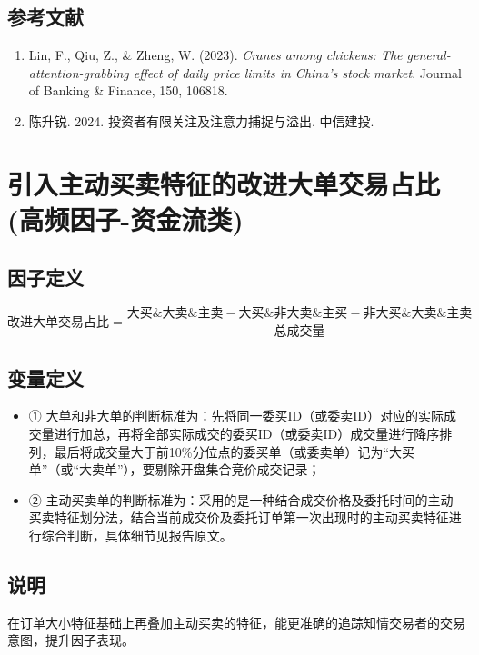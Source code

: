 \documentclass{article}
\begin{document}
\subsection{参考文献}
\begin{enumerate}
    \item Lin, F., Qiu, Z., \& Zheng, W. (2023). \textit{Cranes among chickens: The general-attention-grabbing effect of daily price limits in China's stock market}. Journal of Banking \& Finance, 150, 106818.
    \item 陈升锐. 2024. 投资者有限关注及注意力捕捉与溢出. 中信建投.
\end{enumerate}

\section{引入主动买卖特征的改进大单交易占比(高频因子-资金流类)}

\subsection{因子定义}

\begin{equation}
    \text{改进大单交易占比} = \frac{\text{大买\&大卖\&主卖} - \text{大买\&非大卖\&主买} - \text{非大买\&大卖\&主卖}}{\text{总成交量}}
\end{equation}

\subsection{变量定义}
\begin{itemize}
    \item ① 大单和非大单的判断标准为：先将同一委买ID（或委卖ID）对应的实际成交量进行加总，再将全部实际成交的委买ID（或委卖ID）成交量进行降序排列，最后将成交量大于前10\%分位点的委买单（或委卖单）记为“大买单”（或“大卖单”），要剔除开盘集合竞价成交记录；
    \item ② 主动买卖单的判断标准为：采用的是一种结合成交价格及委托时间的主动买卖特征划分法，结合当前成交价及委托订单第一次出现时的主动买卖特征进行综合判断，具体细节见报告原文。
\end{itemize}

\subsection{说明}
在订单大小特征基础上再叠加主动买卖的特征，能更准确的追踪知情交易者的交易意图，提升因子表现。
\end{document}
